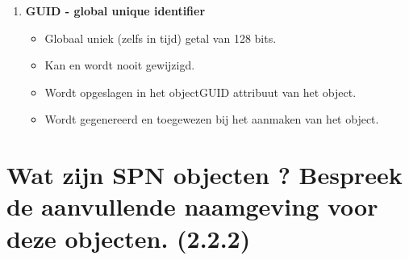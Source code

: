 \begin{enumerate}
\item \textbf{GUID - global unique identifier}
\begin{itemize}
\item Globaal uniek (zelfs in tijd) getal van 128 bits.
\item Kan en wordt nooit gewijzigd.
\item Wordt opgeslagen in het objectGUID attribuut van het object.
\item Wordt gegenereerd en toegewezen bij het aanmaken van het object.
\end{itemize}

\end{enumerate}

\section{Wat zijn SPN objecten ? Bespreek de aanvullende naamgeving voor deze objecten. (2.2.2)}

